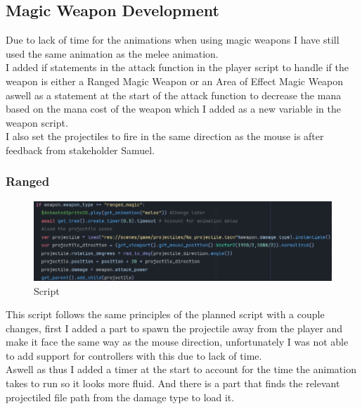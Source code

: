 \documentclass{article}
\begin{document}
        \subsection{Magic Weapon Development}
        Due to lack of time for the animations when using magic weapons I have still used the same animation as the melee animation.\\
        I added if statements in the attack function in the player script to handle if the weapon is either a Ranged Magic Weapon or an Area of Effect Magic Weapon aswell as a statement at the start of the attack function to decrease the mana based on the mana cost of the weapon which I added as a new variable in the weapon script.\\
        I also set the projectiles to fire in the same direction as the mouse is after feedback from stakeholder Samuel.\\
        \subsubsection{Ranged}
        \begin{figure}[H]
                \centering
                \includegraphics[width = 0.9\columnwidth]{images/development/RangedMagic_attack.PNG}
                \caption{Script}
        \end{figure}
        This script follows the same principles of the planned script with a couple changes, first I added a part to spawn the projectile away from the player and make it face the same way as the mouse direction, unfortunately I was not able to add support for controllers with this due to lack of time.\\
        Aswell as thus I added a timer at the start to account for the time the animation takes to run so it looks more fluid. And there is a part that finds the relevant projectiled file path from the damage type to load it.\\
\end{document}
